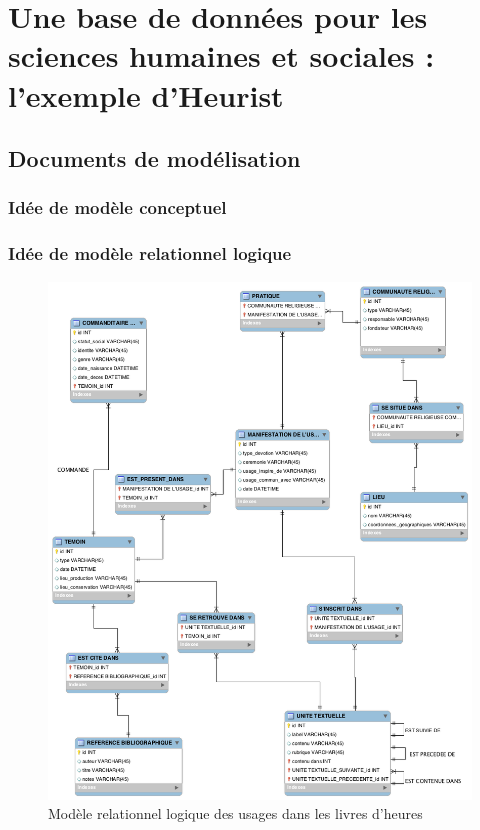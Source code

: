 \documentclass[a4paper,12pt,twoside]{book}
\begin{document}
	
	\chapter{Une base de données pour les sciences humaines et sociales : l'exemple d'Heurist}
	
	\section{\label{doc_modelisation}Documents de modélisation}
	
	\subsection{Idée de modèle conceptuel}
	
    
	
	\subsection{Idée de modèle relationnel logique}
	
	\begin{figure}[!h]
    \centering
    \includegraphics[width=15cm]{img/Modelisation/MRD_Usages.png}
    \caption{Modèle relationnel logique des usages dans les livres d'heures}
    \end{figure}
    \clearpage
	
\end{document}
